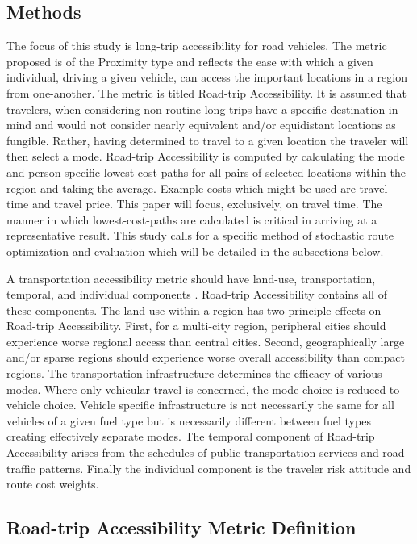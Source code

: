 \documentclass[11pt]{article}
\begin{document}
\begin{multicols}{2}
\section*{Methods}

The focus of this study is long-trip accessibility for road vehicles. The metric proposed is of the Proximity type and reflects the ease with which a given individual, driving a given vehicle, can access the important locations in a region from one-another. The metric is titled Road-trip Accessibility. It is assumed that travelers, when considering non-routine long trips have a specific destination in mind and would not consider nearly equivalent and/or equidistant locations as fungible. Rather, having determined to travel to a given location the traveler will then select a mode. Road-trip Accessibility is computed by calculating the mode and person specific lowest-cost-paths for all pairs of selected locations within the region and taking the average. Example costs which might be used are travel time and travel price. This paper will focus, exclusively, on travel time. The manner in which lowest-cost-paths are calculated is critical in arriving at a representative result. This study calls for a specific method of stochastic route optimization and evaluation which will be detailed in the subsections below.

A transportation accessibility metric should have land-use, transportation, temporal, and individual components \cite{Karst_2003}. Road-trip Accessibility contains all of these components. The land-use within a region has two principle effects on Road-trip Accessibility. First, for a multi-city region, peripheral cities should experience worse regional access than central cities. Second, geographically large and/or sparse regions should experience worse overall accessibility than compact regions. The transportation infrastructure determines the efficacy of various modes. Where only vehicular travel is concerned, the mode choice is reduced to vehicle choice. Vehicle specific infrastructure is not necessarily the same for all vehicles of a given fuel type but is necessarily different between fuel types creating effectively separate modes. The temporal component of Road-trip Accessibility arises from the schedules of public transportation services and road traffic patterns. Finally the individual component is the traveler risk attitude and route cost weights.

\subsection*{Road-trip Accessibility Metric Definition}


\end{multicols}
\end{document}
